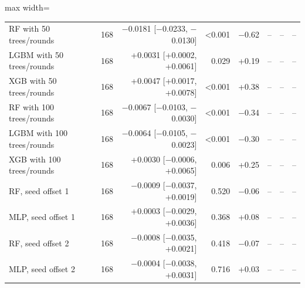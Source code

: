 \begin{table}[t]
\begin{adjustbox}{max width=\linewidth}
\begin{tabular}{lrrrrrrr}
RF with 50 trees/rounds & 168 & $-$0.0181 [$-$0.0233, $-$0.0130] & <0.001 & $-$0.62 & -- & -- & -- \\
LGBM with 50 trees/rounds & 168 & +0.0031 [+0.0002, +0.0061] & 0.029 & +0.19 & -- & -- & -- \\
XGB with 50 trees/rounds & 168 & +0.0047 [+0.0017, +0.0078] & <0.001 & +0.38 & -- & -- & -- \\
RF with 100 trees/rounds & 168 & $-$0.0067 [$-$0.0103, $-$0.0030] & <0.001 & $-$0.34 & -- & -- & -- \\
LGBM with 100 trees/rounds & 168 & $-$0.0064 [$-$0.0105, $-$0.0023] & <0.001 & $-$0.30 & -- & -- & -- \\
XGB with 100 trees/rounds & 168 & +0.0030 [$-$0.0006, +0.0065] & 0.006 & +0.25 & -- & -- & -- \\
RF, seed offset 1 & 168 & $-$0.0009 [$-$0.0037, +0.0019] & 0.520 & $-$0.06 & -- & -- & -- \\
MLP, seed offset 1 & 168 & +0.0003 [$-$0.0029, +0.0036] & 0.368 & +0.08 & -- & -- & -- \\
RF, seed offset 2 & 168 & $-$0.0008 [$-$0.0035, +0.0021] & 0.418 & $-$0.07 & -- & -- & -- \\
MLP, seed offset 2 & 168 & $-$0.0004 [$-$0.0038, +0.0031] & 0.716 & +0.03 & -- & -- & -- \\
\bottomrule
\end{tabular}
\end{adjustbox}
\end{table}

